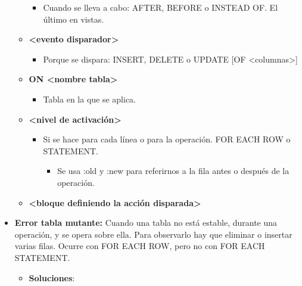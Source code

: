 \documentclass[12pt, twoside, openright]{report} %
\begin{document}
\begin{itemize}
\begin{itemize}
      \begin{itemize}
      \item Cuando se lleva a cabo: AFTER, BEFORE o INSTEAD OF. El último en
        vistas.
        
      \end{itemize}
    \item \textbf{\textless evento disparador\textgreater{}}
      

      \begin{itemize}
      \item Porque se dispara: INSERT, DELETE o UPDATE {[}OF
        \textless columnas\textgreater{]}
        
      \end{itemize}
    \item \textbf{ON \textless nombre tabla\textgreater{}}
      

      \begin{itemize}
      \item Tabla en la que se aplica.
        
      \end{itemize}
    \item \textbf{\textless nivel de activación\textgreater{}}
      

      \begin{itemize}
      \item Si se hace para cada línea o para la operación. FOR EACH ROW o
        STATEMENT.
        

        \begin{itemize}
        \item Se usa :old y :new para referirnos a la fila antes o después
          de la operación.
          
        \end{itemize}
      \end{itemize}
    \item \textbf{\textless bloque definiendo la acción
      disparada\textgreater{}}
      
    \end{itemize}
  \item \textbf{Error tabla mutante:} Cuando una tabla no está estable,
    durante una operación, y se opera sobre ella. Para observarlo hay
    que eliminar o insertar varias filas. Ocurre con FOR EACH ROW, pero
    no con FOR EACH STATEMENT.
    

    \begin{itemize}
    \item \textbf{Soluciones}:
      


\end{itemize}
\end{itemize}
\end{document}
